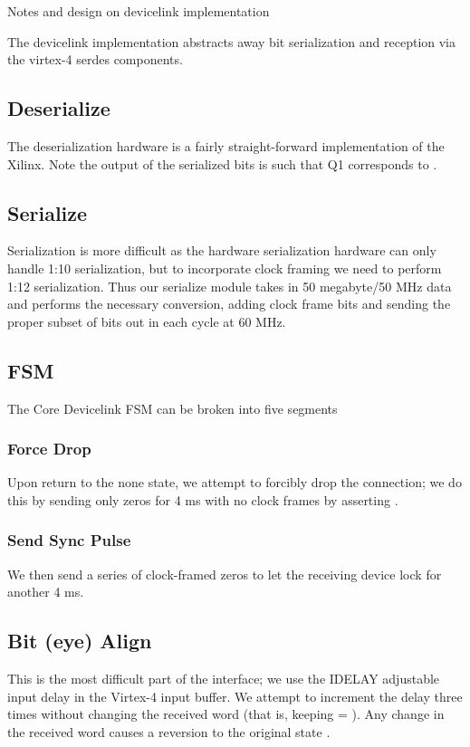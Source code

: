 Notes and design on devicelink implementation

The devicelink implementation abstracts away bit serialization and reception via the virtex-4 serdes components. 

\subsection{Deserialize}
The deserialization hardware is a fairly straight-forward implementation of the Xilinx. Note the output of the serialized bits is such that Q1 corresponds to . 

\subsection{Serialize}
Serialization is more difficult as the hardware serialization hardware
can only handle 1:10 serialization, but to incorporate clock framing
we need to perform 1:12 serialization. Thus our serialize module takes
in 50 megabyte/50 MHz data and performs the necessary conversion,
adding clock frame bits and sending the proper subset of bits out in
each cycle at 60 MHz.


\subsection{FSM} 
The Core Devicelink FSM can be broken into five segments

\subsubsection{Force Drop}
Upon return to the none state, we attempt to forcibly drop the
connection; we do this by sending only zeros for 4 ms with no clock
frames by asserting .

\subsubsection{Send Sync Pulse}
We then send a series of clock-framed zeros to let the receiving
device lock for another 4 ms.

\subsection{Bit (eye) Align}
This is the most difficult part of the interface; we use the IDELAY
adjustable input delay in the Virtex-4 input buffer. We attempt to
increment the delay three times without changing the received word
(that is, keeping  = ). Any change in
the received word causes a reversion to the original state
.

